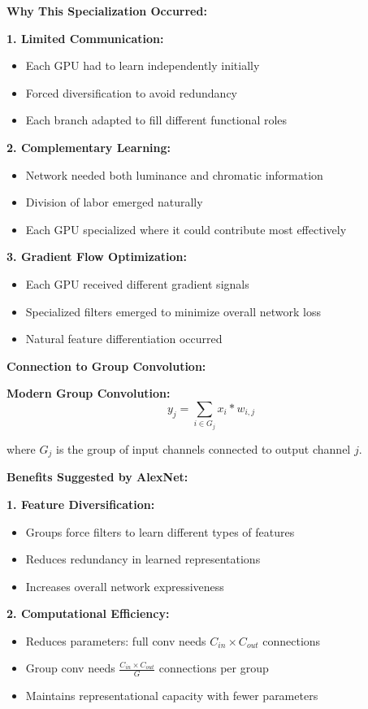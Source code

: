 \documentclass[12pt]{article}
\begin{document}
\begin{enumerate}[(a)]
{    \textbf{Why This Specialization Occurred:}
    
    \textbf{1. Limited Communication:}
    \begin{itemize}
        \item Each GPU had to learn independently initially
        \item Forced diversification to avoid redundancy
        \item Each branch adapted to fill different functional roles
    \end{itemize}
    
    \textbf{2. Complementary Learning:}
    \begin{itemize}
        \item Network needed both luminance and chromatic information
        \item Division of labor emerged naturally
        \item Each GPU specialized where it could contribute most effectively
    \end{itemize}
    
    \textbf{3. Gradient Flow Optimization:}
    \begin{itemize}
        \item Each GPU received different gradient signals
        \item Specialized filters emerged to minimize overall network loss
        \item Natural feature differentiation occurred
    \end{itemize}
    
    \textbf{Connection to Group Convolution:}
    
    \textbf{Modern Group Convolution:}
    $$y_j = \sum_{i \in G_j} x_i * w_{i,j}$$
    
    where $G_j$ is the group of input channels connected to output channel $j$.
    
    \textbf{Benefits Suggested by AlexNet:}
    
    \textbf{1. Feature Diversification:}
    \begin{itemize}
        \item Groups force filters to learn different types of features
        \item Reduces redundancy in learned representations
        \item Increases overall network expressiveness
    \end{itemize}
    
    \textbf{2. Computational Efficiency:}
    \begin{itemize}
        \item Reduces parameters: full conv needs $C_{in} \times C_{out}$ connections
        \item Group conv needs $\frac{C_{in} \times C_{out}}{G}$ connections per group
        \item Maintains representational capacity with fewer parameters
    \end{itemize}
    
}
\end{enumerate}
\end{document}
